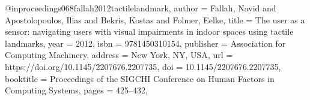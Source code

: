 @inproceedings{068fallah2012tactilelandmark,
author = {Fallah, Navid and Apostolopoulos, Ilias and Bekris, Kostas and Folmer, Eelke},
title = {The user as a sensor: navigating users with visual impairments in indoor spaces using tactile landmarks},
year = {2012},
isbn = {9781450310154},
publisher = {Association for Computing Machinery},
address = {New York, NY, USA},
url = {https://doi.org/10.1145/2207676.2207735},
doi = {10.1145/2207676.2207735},
booktitle = {Proceedings of the SIGCHI Conference on Human Factors in Computing Systems},
pages = {425–432},
}